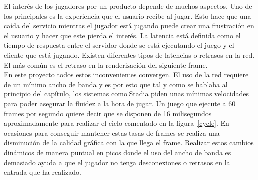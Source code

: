 El inter\'es de los jugadores por un producto depende de muchos aspectos. Uno de los principales es la experiencia que el usuario recibe al jugar. Esto hace que una ca\'ida del servicio mientras el jugador est\'a jugando puede crear una frustraci\'on en el usuario y hacer que este pierda el inter\'es. La latencia est\'a definida como el tiempo de respuesta entre el servidor donde se est\'a ejecutando el juego y el cliente que est\'a jugando. Existen diferentes tipos de latencias o retrasos en la red. El m\'as com\'un es el retraso en la renderizaci\'on del siguiente frame. \\

En este proyecto todos estos inconvenientes convergen. El uso de la red requiere de un m\'inimo ancho de banda y es por esto que tal y como se hablaba al principio del cap\'itulo, los sistemas como Stadia piden unas m\'inimas velocidades para poder asegurar la fluidez a la hora de jugar. Un juego que ejecute a 60 frames por segundo quiere decir que se disponen de 16 milisegundos aproximadamente para realizar el ciclo comentado en la figura~\ref{cycle}. En ocasiones para conseguir mantener estas tasas de frames se realiza una disminuci\'on de la calidad gr\'afica con la que llega el frame. Realizar estos cambios din\'amicos de manera puntual en picos donde el uso del ancho de banda es demasiado ayuda a que el jugador no tenga desconexiones o retrasos en la entrada que ha realizado.\\





